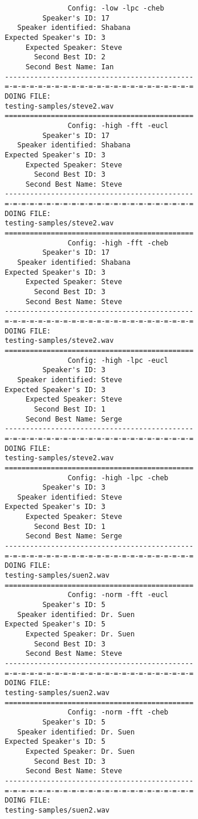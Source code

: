 \begin{verbatim}
               Config: -low -lpc -cheb
         Speaker's ID: 17
   Speaker identified: Shabana
Expected Speaker's ID: 3
     Expected Speaker: Steve
       Second Best ID: 2
     Second Best Name: Ian
---------------------------------------------
=-=-=-=-=-=-=-=-=-=-=-=-=-=-=-=-=-=-=-=-=-=-=
DOING FILE:
testing-samples/steve2.wav
=============================================
               Config: -high -fft -eucl
         Speaker's ID: 17
   Speaker identified: Shabana
Expected Speaker's ID: 3
     Expected Speaker: Steve
       Second Best ID: 3
     Second Best Name: Steve
---------------------------------------------
=-=-=-=-=-=-=-=-=-=-=-=-=-=-=-=-=-=-=-=-=-=-=
DOING FILE:
testing-samples/steve2.wav
=============================================
               Config: -high -fft -cheb
         Speaker's ID: 17
   Speaker identified: Shabana
Expected Speaker's ID: 3
     Expected Speaker: Steve
       Second Best ID: 3
     Second Best Name: Steve
---------------------------------------------
=-=-=-=-=-=-=-=-=-=-=-=-=-=-=-=-=-=-=-=-=-=-=
DOING FILE:
testing-samples/steve2.wav
=============================================
               Config: -high -lpc -eucl
         Speaker's ID: 3
   Speaker identified: Steve
Expected Speaker's ID: 3
     Expected Speaker: Steve
       Second Best ID: 1
     Second Best Name: Serge
---------------------------------------------
=-=-=-=-=-=-=-=-=-=-=-=-=-=-=-=-=-=-=-=-=-=-=
DOING FILE:
testing-samples/steve2.wav
=============================================
               Config: -high -lpc -cheb
         Speaker's ID: 3
   Speaker identified: Steve
Expected Speaker's ID: 3
     Expected Speaker: Steve
       Second Best ID: 1
     Second Best Name: Serge
---------------------------------------------
=-=-=-=-=-=-=-=-=-=-=-=-=-=-=-=-=-=-=-=-=-=-=
DOING FILE:
testing-samples/suen2.wav
=============================================
               Config: -norm -fft -eucl
         Speaker's ID: 5
   Speaker identified: Dr. Suen
Expected Speaker's ID: 5
     Expected Speaker: Dr. Suen
       Second Best ID: 3
     Second Best Name: Steve
---------------------------------------------
=-=-=-=-=-=-=-=-=-=-=-=-=-=-=-=-=-=-=-=-=-=-=
DOING FILE:
testing-samples/suen2.wav
=============================================
               Config: -norm -fft -cheb
         Speaker's ID: 5
   Speaker identified: Dr. Suen
Expected Speaker's ID: 5
     Expected Speaker: Dr. Suen
       Second Best ID: 3
     Second Best Name: Steve
---------------------------------------------
=-=-=-=-=-=-=-=-=-=-=-=-=-=-=-=-=-=-=-=-=-=-=
DOING FILE:
testing-samples/suen2.wav

\end{verbatim}
